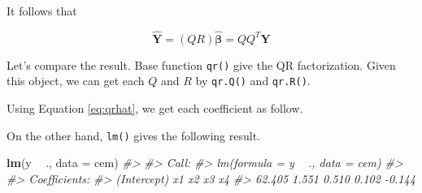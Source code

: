 \documentclass[]{book}
\newenvironment{Shaded}{\begin{snugshade}}{\end{snugshade}}
\newcommand{\CommentTok}[1]{\textcolor[rgb]{0.56,0.35,0.01}{\textit{#1}}}
\newcommand{\DataTypeTok}[1]{\textcolor[rgb]{0.13,0.29,0.53}{#1}}
\newcommand{\KeywordTok}[1]{\textcolor[rgb]{0.13,0.29,0.53}{\textbf{#1}}}
\newcommand{\NormalTok}[1]{#1}
\newcommand{\OperatorTok}[1]{\textcolor[rgb]{0.81,0.36,0.00}{\textbf{#1}}}
\newcommand{\StringTok}[1]{\textcolor[rgb]{0.31,0.60,0.02}{#1}}
\theoremstyle{definition}
\theoremstyle{definition}
\theoremstyle{definition}
\theoremstyle{remark}
\begin{document}
It follows that

\begin{equation}
  \mathbf{\hat{Y}} = (QR)\boldsymbol{\hat\beta} = QQ^T\mathbf{Y}
  \label{eq:qrfit}
\end{equation}

Let's compare the result. Base function \texttt{qr()} give the QR factorization. Given this object, we can get each \(Q\) and \(R\) by \texttt{qr.Q()} and \texttt{qr.R()}.

\begin{Shaded}
\end{Shaded}

Using Equation \eqref{eq:qrhat}, we get each coefficient as follow.

\begin{Shaded}
\end{Shaded}

On the other hand, \texttt{lm()} gives the following result.

\begin{Shaded}
\begin{Highlighting}[]
\KeywordTok{lm}\NormalTok{(y }\OperatorTok{~}\StringTok{ }\NormalTok{., }\DataTypeTok{data =}\NormalTok{ cem)}
\CommentTok{#> }
\CommentTok{#> Call:}
\CommentTok{#> lm(formula = y ~ ., data = cem)}
\CommentTok{#> }
\CommentTok{#> Coefficients:}
\CommentTok{#> (Intercept)           x1           x2           x3           x4  }
\CommentTok{#>      62.405        1.551        0.510        0.102       -0.144}
\end{Highlighting}
\end{Shaded}
\end{document}
